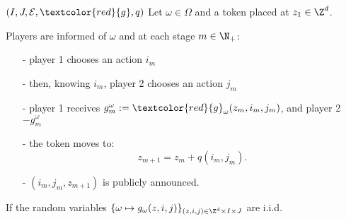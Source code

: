 \begin{frame}{$(I, J, \mathcal{E}, \textcolor{red}{g}, q)$}
  Let $\omega \in \Omega$ and a token placed at $z_1 \in \Z^d$.
  \vspace{0.2cm}

  Players are informed of $\omega$ and at each stage $m \in \N_+$:
  \begin{itemize}
    \item[-] player 1 chooses an action $i_m$ 
    \item[-] then, knowing $i_m$, player 2 chooses an action $j_m$
    \item[-] player 1 receives $g_m^{\omega} := \textcolor{red}{g}_{\omega}(z_{m}, i_m, j_m)$, and player 2 $-g_m^{\omega}$
    \item[-] the token moves to:  
      \[
        z_{m+1} = z_m + q(i_m, j_m).
      \]
    \item[-] $(i_m, j_m, z_{m+1})$ is publicly announced.
  \end{itemize}
  

  \begin{definition}[i.i.d.]
   \color{red} If the random variables $\{\omega \mapsto g_{\omega}(z, i, j)\}_{(z, i, j) \in \Z^d \times I \times J}$ are i.i.d.
  \end{definition}  
\end{frame} 



